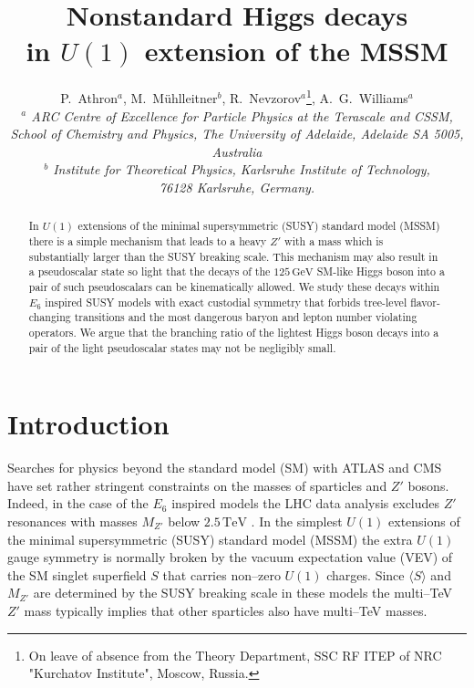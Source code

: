 \documentclass[12pt,a4paper]{article}
\begin{document}
\title{
\textbf{Nonstandard Higgs decays\\ in $U(1)$ extension of the MSSM\\[4mm]}}

\date{}
\author{
P.~Athron${}^{a}$,
M.~M\"{u}hlleitner$^{b}$,
R.~Nevzorov${}^{a}$\footnote{On leave of absence from the Theory Department, SSC RF ITEP of NRC "Kurchatov Institute", Moscow, Russia.},
A.~G.~Williams${}^{a}$\\[9mm]
{\small\it $^a$ ARC Centre of Excellence for Particle Physics at the Terascale and CSSM,}\\
{\small\it School of Chemistry and Physics, The University of Adelaide, Adelaide SA 5005, Australia}\\[3mm]
{\small\it $^b$ Institute for Theoretical Physics, Karlsruhe Institute of Technology,} \\
{\small\it 76128 Karlsruhe, Germany.}\\
}

\maketitle

\begin{abstract}
\noindent
In $U(1)$ extensions of the minimal supersymmetric (SUSY) standard
model (MSSM) there is a simple mechanism that leads to a heavy $Z'$
with a mass which is substantially larger than the SUSY breaking
scale. This mechanism may also result in a pseudoscalar state so light
that the decays of the $125\,\mbox{GeV}$ SM-like Higgs boson into a
pair of such pseudoscalars can be kinematically allowed.  We study
these decays within $E_6$ inspired SUSY models with exact custodial
symmetry that forbids tree-level flavor-changing transitions and the
most dangerous baryon and lepton number violating operators. We argue
that the branching ratio of the lightest Higgs boson decays into a
pair of the light pseudoscalar states may not be negligibly small.
\end{abstract}
\thispagestyle{empty}
\vfill
\newpage
\setcounter{page}{1}



\section{Introduction}
Searches for physics beyond the standard model (SM) with ATLAS and CMS
have set rather stringent constraints on the masses of sparticles and
$Z'$ bosons. Indeed, in the case of the $E_6$ inspired models the LHC
data analysis excludes $Z'$ resonances with masses $M_{Z'}$ below
$2.5\,\mbox{TeV}$ \cite{1,2}. In the simplest $U(1)$ extensions of the
minimal supersymmetric (SUSY) standard model (MSSM) the extra $U(1)$
gauge symmetry is normally broken by the vacuum expectation value
(VEV) of the SM singlet superfield $S$ that carries non--zero $U(1)$
charges. Since $\langle S\rangle$ and $M_{Z'}$ are determined by the
SUSY breaking scale in these models the multi--TeV $Z'$ mass typically
implies that other sparticles also have multi--TeV masses.
\end{document}
